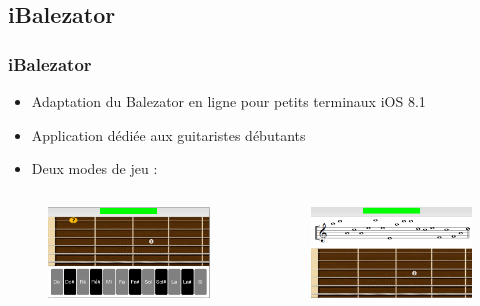 \documentclass{beamer}
\begin{document}
	\subsection{iBalezator}
	\begin{frame}

		\frametitle{iBalezator}
		\begin{itemize}
			\item Adaptation du Balezator en ligne pour petits terminaux iOS 8.1
			\item Application dédiée aux guitaristes débutants
			\item Deux modes de jeu :
		\end{itemize}


		\begin{columns}

			 \begin{column}{0.5\textwidth}
				\begin{figure}
					\includegraphics[width=5cm]{images/presentation_mc_question.png}
	
				\end{figure}

			\end{column}

			 \begin{column}{0.5\textwidth}
				\begin{figure}
					\includegraphics[width=5cm]{images/presentation_pm.png}
					
				\end{figure}
				
			\end{column}

		\end{columns} 
	\end{frame} 


\end{document}
